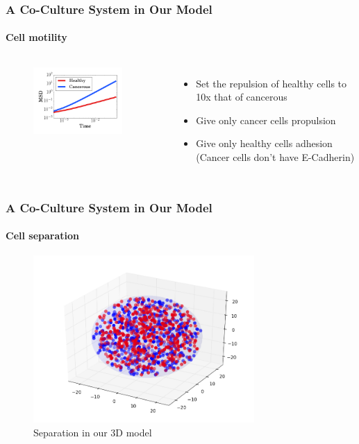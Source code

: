 \documentclass{beamer}
\begin{document}
  \begin{frame}
    \frametitle{A Co-Culture System in Our Model}
    \framesubtitle{Cell motility}
  	\begin{columns}[t] 
  	\begin{figure}[h]
  	  \includegraphics[width=2.5in]{cocultureMSD.png}
  	\end{figure}
      \vspace{0.25in} \\
      \begin{itemize}
      \item Set the repulsion of healthy cells to 10x that of cancerous \\
      \item Give only cancer cells propulsion \\
      \item Give only healthy cells adhesion (Cancer cells don't have E-Cadherin)
      \end{itemize}
    \end{columns}
    \vfill
  \end{frame}

  \begin{frame}
    \frametitle{A Co-Culture System in Our Model}
    \framesubtitle{Cell separation}
    \begin{figure}
  	  \includegraphics[width=0.75\textwidth]{3dconf.png}
      \caption{Separation in our 3D model}
    \end{figure}
    \vfill
  \end{frame}
  
\end{document}
